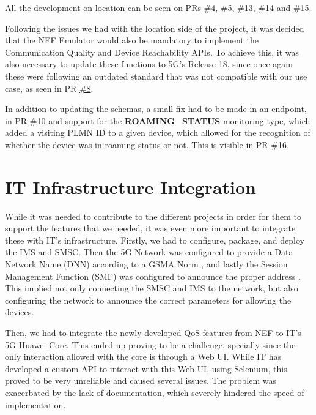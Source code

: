 All the development on location can be seen on PRs
\href{https://github.com/ATNoG/NEF_emulator/pull/4}{\#4},
\href{https://github.com/ATNoG/NEF_emulator/pull/5}{\#5},
\href{https://github.com/ATNoG/NEF_emulator/pull/13}{\#13},
\href{https://github.com/ATNoG/NEF_emulator/pull/14}{\#14} and
\href{https://github.com/ATNoG/NEF_emulator/pull/15}{\#15}.

Following the issues we had with the location side of the
project, it was decided that the NEF Emulator would also be
mandatory to implement the Communication Quality and Device
Reachability APIs. To achieve this, it was also necessary to
update these functions to 5G's Release 18, since once again
these were following an outdated standard that was not compatible
with our use case, as seen in PR
\href{https://github.com/ATNoG/NEF_emulator/pull/8}{\#8}.

In addition to updating the schemas, a small fix had to be made
in an endpoint, in PR
\href{https://github.com/ATNoG/NEF_emulator/pull/10}{\#10}
and support for the \textbf{ROAMING\_STATUS} monitoring type,
which added a visiting PLMN ID to a given device, which allowed
for the recognition of whether the device was in roaming status
or not. This is visible in PR
\href{https://github.com/ATNoG/NEF_emulator/pull/16}{\#16}.


\section{IT Infrastructure Integration}

While it was needed to contribute to the different projects in order for them
to support the features that we needed, it was even more important to integrate
these with IT's infrastructure. Firstly, we had to configure, package, and
deploy the IMS and SMSC. Then the 5G Network was configured to provide a Data
Network Name (DNN) according to a GSMA Norm \cite{NG113}, and lastly the
Session Management Function (SMF) was configured to announce the proper address
\cite{TS23501} \cite{TS23228}. This implied not only connecting the SMSC and
IMS to the network, but also configuring the network to announce the correct
parameters for allowing the devices.

Then, we had to integrate the newly developed QoS features from
NEF to IT's 5G Huawei Core. This ended up proving to be a
challenge, specially since the only interaction allowed with the
core is through a Web UI. While IT has developed a custom API to
interact with this Web UI, using Selenium, this proved to be very
unreliable and caused several issues. The problem was exacerbated
by the lack of documentation, which severely hindered the speed of
implementation.

